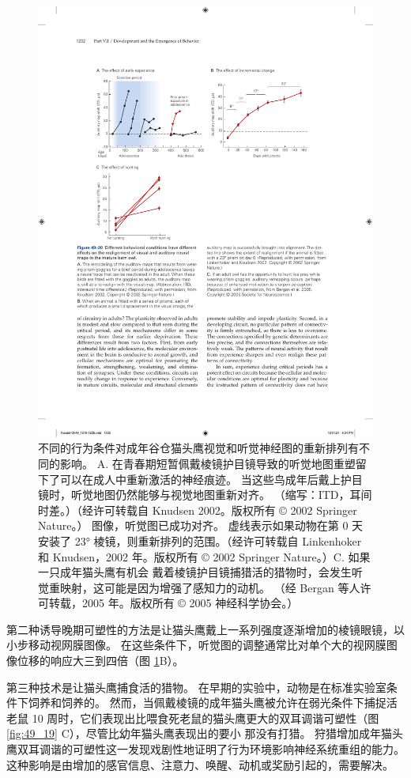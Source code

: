 \begin{figure}[htbp]
	\centering
	\includegraphics[width=0.8\linewidth]{chap49/fig_49_20}
	\caption{不同的行为条件对成年谷仓猫头鹰视觉和听觉神经图的重新排列有不同的影响。 A. 在青春期短暂佩戴棱镜护目镜导致的听觉地图重塑留下了可以在成人中重新激活的神经痕迹。 当这些鸟成年后戴上护目镜时，听觉地图仍然能够与视觉地图重新对齐。 （缩写：ITD，耳间时差。）（经许可转载自 Knudsen 2002。版权所有 © 2002 Springer Nature。） 图像，听觉图已成功对齐。 虚线表示如果动物在第 0 天安装了 23° 棱镜，则重新排列的范围。（经许可转载自 Linkenhoker 和 Knudsen，2002 年。版权所有 © 2002 Springer Nature。）C. 如果一只成年猫头鹰有机会 戴着棱镜护目镜捕猎活的猎物时，会发生听觉重映射，这可能是因为增强了感知力的动机。 （经 Bergan 等人许可转载，2005 年。版权所有 © 2005 神经科学协会。）}
	\label{fig:49_20}
\end{figure}

第二种诱导晚期可塑性的方法是让猫头鹰戴上一系列强度逐渐增加的棱镜眼镜，以小步移动视网膜图像。 在这些条件下，听觉图的调整通常比对单个大的视网膜图像位移的响应大三到四倍（图 \ref{fig:49_20}B）。

第三种技术是让猫头鹰捕食活的猎物。 在早期的实验中，动物是在标准实验室条件下饲养和饲养的。 然而，当佩戴棱镜的成年猫头鹰被允许在弱光条件下捕捉活老鼠 10 周时，它们表现出比喂食死老鼠的猫头鹰更大的双耳调谐可塑性（图 \ref{fig:49_19} C），尽管比幼年猫头鹰表现出的要小 那没有打猎。 狩猎增加成年猫头鹰双耳调谐的可塑性这一发现戏剧性地证明了行为环境影响神经系统重组的能力。 这种影响是由增加的感官信息、注意力、唤醒、动机或奖励引起的，需要解决。

